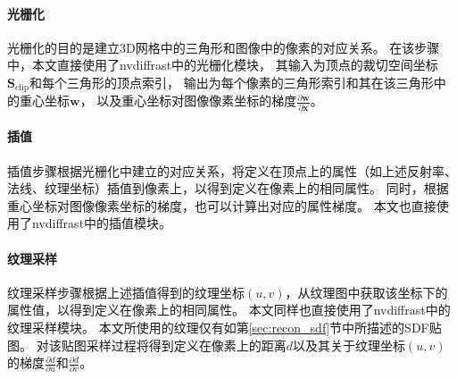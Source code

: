 \paragraph{光栅化}
光栅化的目的是建立3D网格中的三角形和图像中的像素的对应关系。
在该步骤中，本文直接使用了nvdiffrast中的光栅化模块，
其输入为顶点的裁切空间坐标$\mathbf{S}_\mathrm{clip}$和每个三角形的顶点索引，
输出为每个像素的三角形索引和其在该三角形中的重心坐标$\mathbf{w}$，
以及重心坐标对图像像素坐标的梯度$\frac{\partial\mathbf{w}}{\partial\mathbf{x}}$。

\paragraph{插值}
插值步骤根据光栅化中建立的对应关系，将定义在顶点上的属性（如上述反射率、法线、纹理坐标）插值到像素上，以得到定义在像素上的相同属性。
同时，根据重心坐标对图像像素坐标的梯度，也可以计算出对应的属性梯度。
本文也直接使用了nvdiffrast中的插值模块。

\paragraph{纹理采样}
纹理采样步骤根据上述插值得到的纹理坐标$(u,v)$，从纹理图中获取该坐标下的属性值，以得到定义在像素上的相同属性。
本文同样也直接使用了nvdiffrast中的纹理采样模块。
本文所使用的纹理仅有如第\ref{sec:recon_sdf}节中所描述的SDF贴图。
对该贴图采样过程将得到定义在像素上的距离$d$以及其关于纹理坐标$(u,v)$的梯度$\frac{\partial d}{\partial u}$和$\frac{\partial d}{\partial v}$。

